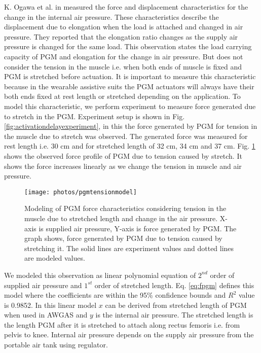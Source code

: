 \documentclass[paper,JRM,paper]{jaciiiarticle}
\begin{document}
K. Ogawa et al. in \cite{13} measured the force and displacement characteristics for the change in the internal air pressure. These characteristics describe the displacement due to elongation when the load is attached and changed in air pressure. They reported that the elongation ratio changes as the supply air pressure is changed for the same load. This observation states the load carrying capacity of PGM and elongation for the change in air pressure. But does not consider the tension in the muscle i.e. when both ends of muscle is fixed and PGM is stretched before actuation. It is important to measure this characteristic because in the wearable assistive suits the PGM actuators will always have their both ends fixed at rest length or stretched depending on the application. To model this characteristic, we perform experiment to measure force generated due to stretch in the PGM. Experiment setup is shown in Fig. \ref{fig:activationdelayexperiment}, in this the force generated by PGM for tension in the muscle due to stretch was observed. The generated force was measured for rest length i.e. 30 cm and for stretched length of 32 cm, 34 cm and 37 cm. Fig. \ref{fig:tensionmodel}  shows the observed force profile of PGM due to tension caused by stretch. It shows the force increases linearly as we change the tension in muscle and air pressure. 



\begin{figure}[h]
	\centering
	\texttt{[image: photos/pgmtensionmodel]}
	\caption{Modeling of PGM force characteristics considering tension in the muscle due to stretched length and change in the air pressure. X-axis is supplied air pressure, Y-axis is force generated by PGM. The graph shows, force generated by PGM due to tension caused by stretching it. The solid lines are experiment values and dotted lines are modeled values.}
	\label{fig:tensionmodel}
\end{figure}

We modeled this observation as linear polynomial equation of $2^{nd}$ order of supplied air pressure and $1^{st}$ order of stretched length. Eq. \ref{eq:fpgm} defines this model where the coefficients are within the 95\% confidence bounds and $R^{2}$ value is 0.9852. In this linear model $x$ can be derived from stretched length of PGM when used in AWGAS and $y$ is the internal air pressure. The stretched length is the length PGM after it is stretched to attach along rectus femoris i.e. from pelvis to knee. Internal air pressure depends on the supply air pressure from the portable air tank using regulator. 
\end{document}
